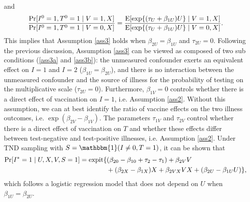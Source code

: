 \documentclass[11pt]{article}
\begin{document}
and 
\begin{align*}
    \dfrac{\Pr[I^0=1, T^0=1 \mid V=1,X]}{\Pr[I^0=1, T^0=1\mid V=0,X]}=\dfrac{\operatorname{E}[\exp\{(\tau_U  +\beta_{1U})U\}\mid V=1, X]}{\operatorname{E}[\exp\{(\tau_U +\beta_{1U})U\}\mid V=0, X]}.
\end{align*}
This implies that Assumption \ref{ass3} holds when $\beta_{2U}=\beta_{1U}$ and $\tau_{2U}=0$. Following the previous discussion, Assumption \ref{ass3} can be viewed as composed of two sub conditions (\ref{ass3a} and \ref{ass3b}): the unmeasured confounder exerts an equivalent effect on $I=1$ and $I=2$ ($\beta_{1U}=\beta_{2U}$), and there is no interaction between the unmeasured confounder and the source of illness for the probability of testing on the multiplicative scale ($\tau_{2U}=0$). Furthermore, $\beta_{1V}=0$ controls whether there is a direct effect of vaccination on $I = 1$, i.e. Assumption \ref{ass2}. Without this assumption, we can at best identify the ratio of vaccine effects on the two illness outcomes, i.e. $\exp(\beta_{2V}-\beta_{1V})$. The parameters $\tau_{1V}$ and $\tau_{2V}$ control whether there is a direct effect of vaccination on $T$ and whether these effects differ between test-negative and test-positive illnesses, i.e. Assumption \ref{ass2}. Under TND sampling with $S=\mathbbm{1}(I \neq 0, T = 1)$, it can be shown that
\begin{align*}
    \Pr[I^*=1 \mid U, X, V, S=1] &= \mathrm{expit}\{(\beta_{20}-\beta_{10}+\tau_2 - \tau_1) + \beta_{2V}V\\ &\qquad\qquad+(\beta_{2X}-\beta_{1X})X+\beta_{2VX}VX + (\beta_{2U} - \beta_{1U}U)\},
\end{align*}
which follows a logistic regression model that does not depend on $U$ when $\beta_{1U}=\beta_{2U}$. 
\end{document}

